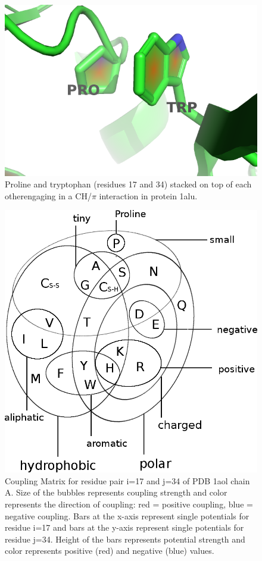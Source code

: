 \documentclass[12pt,a4paper,twoside]{book}
\theoremstyle{definition}
\theoremstyle{definition}
\theoremstyle{remark}
\begin{document}
\begin{figure}
\includegraphics[width=0.5\linewidth]{img/coupling_matrix_analysis/1aolA00_17_34} \caption{Proline and
tryptophan (residues 17 and 34) stacked on top of each otherengaging in
a CH/\(\pi\) interaction in protein 1alu.}\label{fig:coupling-matrix-aromatic-proline-pymol}
\end{figure}










\begin{figure}
\includegraphics[width=1\linewidth]{img/amino_acid_physico_chemical_properties_venn_diagramm} \caption{Coupling Matrix for
residue pair i=17 and j=34 of PDB 1aol chain A. Size of the bubbles
represents coupling strength and color represents the direction of
coupling: red = positive coupling, blue = negative coupling. Bars at the
x-axis represent single potentials for residue i=17 and bars at the
y-axis represent single potentials for residue j=34. Height of the bars
represents potential strength and color represents positive (red) and
negative (blue) values.}\label{fig:coupling-matrix-aromatic-proline}
\end{figure}
\end{document}
